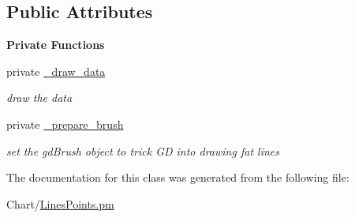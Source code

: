 \subsection*{Public Attributes}
\begin{Indent}{\bf Private Functions}\par
{\em \label{_amgrp8d29cff216bafa3117e21883ea7c6b5f}
 }\begin{DoxyCompactItemize}
\item 
\hypertarget{classChart_1_1LinesPoints_a52414c96effaab4189c8488e2ebae742}{
private \hyperlink{classChart_1_1LinesPoints_a52414c96effaab4189c8488e2ebae742}{\_\-draw\_\-data}}
\label{classChart_1_1LinesPoints_a52414c96effaab4189c8488e2ebae742}

\begin{DoxyCompactList}\small\item\em draw the data \item\end{DoxyCompactList}\item 
\hypertarget{classChart_1_1LinesPoints_aaf5def497066928c3c6aa048b847b775}{
private \hyperlink{classChart_1_1LinesPoints_aaf5def497066928c3c6aa048b847b775}{\_\-prepare\_\-brush}}
\label{classChart_1_1LinesPoints_aaf5def497066928c3c6aa048b847b775}

\begin{DoxyCompactList}\small\item\em set the gdBrush object to trick GD into drawing fat lines \item\end{DoxyCompactList}\end{DoxyCompactItemize}
\end{Indent}


The documentation for this class was generated from the following file:\begin{DoxyCompactItemize}
\item 
Chart/\hyperlink{LinesPoints_8pm}{LinesPoints.pm}\end{DoxyCompactItemize}
